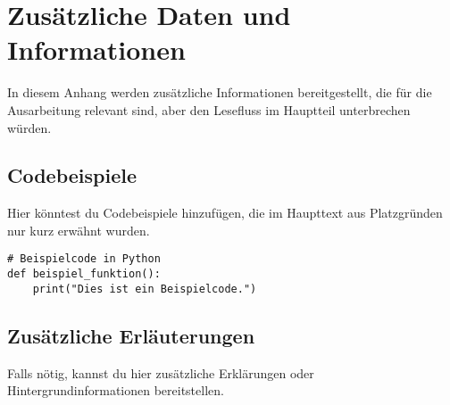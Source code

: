 
\chapter{Zusätzliche Daten und Informationen}
\label{appendix_a}

In diesem Anhang werden zusätzliche Informationen bereitgestellt, die für die Ausarbeitung relevant sind, aber den Lesefluss im Hauptteil unterbrechen würden.




\section{Codebeispiele}

Hier könntest du Codebeispiele hinzufügen, die im Haupttext aus Platzgründen nur kurz erwähnt wurden.

\begin{verbatim}
# Beispielcode in Python
def beispiel_funktion():
    print("Dies ist ein Beispielcode.")
\end{verbatim}

\section{Zusätzliche Erläuterungen}

Falls nötig, kannst du hier zusätzliche Erklärungen oder Hintergrundinformationen bereitstellen.

